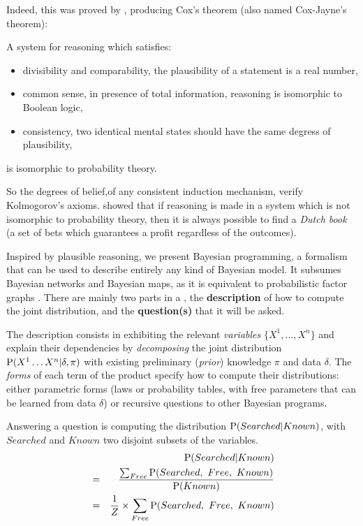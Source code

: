Indeed, this was proved by \cite{Cox46}, producing Cox's theorem (also named Cox-Jayne's theorem):
\begin{mythm}
A system for reasoning which satisfies:
\begin{itemize}
    \item divisibility and comparability, the plausibility of a statement is a real number,
    \item common sense, in presence of total information, reasoning is isomorphic to Boolean logic,
    \item consistency, two identical mental states should have the same degress of plausibility,
\end{itemize}
is isomorphic to probability theory.
\end{mythm}
So the degrees of belief,of any consistent induction mechanism, verify Kolmogorov's axioms. \cite{DeFinetti37} showed that if reasoning is made in a system which is not isomorphic to probability theory, then it is always possible to find a \textit{Dutch book} (a set of bets which guarantees a profit regardless of the outcomes).


Inspired by plausible reasoning, we present Bayesian programming, a formalism that can be used to describe entirely any kind of Bayesian model. It subsumes Bayesian networks and Bayesian maps, as it is equivalent to probabilistic factor graphs \cite{Diard03}. There are mainly two parts in a , the \textbf{description} of how to compute the joint distribution, and the \textbf{question(s)} that it will be asked. 

The description consists in exhibiting the relevant \textit{variables} $\{X^1,\dots,X^n\}$ and explain their dependencies by \textit{decomposing} the joint distribution $\mathrm{P}(X^1\dots X^n | \delta, \pi)$ with existing preliminary (\textit{prior}) knowledge $\pi$ and data $\delta$. The \textit{forms} of each term of the product specify how to compute their distributions: either parametric forms (laws or probability tables, with free parameters that can be learned from data $\delta$) or recursive questions to other Bayesian programs.

Answering a question is computing the distribution $\mathrm{P}(Searched | Known)$, with $Searched$ and $Known$ two disjoint subsets of the variables. 
\begin{eqnarray}
& & \mathrm{P}(Searched | Known) \\
& = & \frac{\sum_{Free}\mathrm{P}(Searched,\ Free,\ Known)}{\mathrm{P}(Known)} \\
& = & \frac{1}{Z}\times \sum_{Free} \mathrm{P}(Searched,\ Free,\ Known)
\end{eqnarray}

